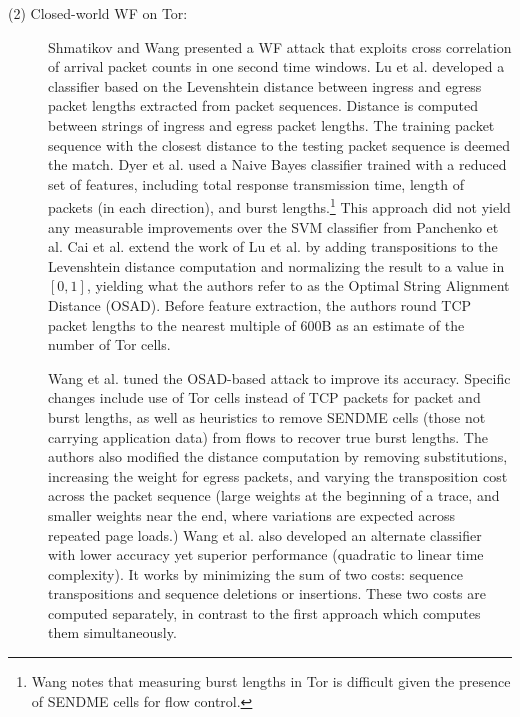 \documentclass[runningheads]{llncs}
\begin{document}
\begin{description}
\item [(2) Closed-world WF on Tor:] Shmatikov and Wang \cite{shmatikov2006timing}
presented a WF attack that exploits cross correlation of arrival packet counts in
one second time windows.
Lu et al. \cite{lu2010website} developed a classifier based on the Levenshtein distance between
ingress and egress packet lengths extracted from packet sequences. Distance is computed between
strings of ingress and egress packet lengths. The training packet sequence with the closest
distance to the testing packet sequence is deemed the match. Dyer et al. \cite{dyer2012peek}
used a Naive Bayes classifier trained with a reduced set of features, including total
response transmission time, length of packets (in each direction), and burst lengths.\footnote{Wang
\cite{wang2016website} notes that measuring burst lengths in Tor is difficult given the presence of
SENDME cells for flow control.} This approach did not yield any measurable improvements over
the SVM classifier from Panchenko et al. Cai et al. \cite{cai2012touching} extend the work of Lu et al.
by adding transpositions to the Levenshtein distance computation and normalizing the result to
a value in $[0,1]$, yielding what the authors refer to as the Optimal String Alignment Distance
(OSAD). Before feature extraction, the authors round TCP packet lengths to the nearest multiple of
$600$B as an estimate of the number of Tor cells.

Wang et al. \cite{wang2013improved} tuned the OSAD-based attack to improve its accuracy. Specific changes
include use of Tor cells instead of TCP packets for packet and burst lengths, as well as heuristics
to remove SENDME cells (those not carrying application data) from flows to recover true
burst lengths. The authors also modified the distance computation by removing substitutions,
increasing the weight for egress packets, and varying the transposition cost across the packet
sequence (large weights at the beginning of a trace, and smaller weights near the end, where
variations are expected across repeated page loads.) Wang et al. also developed an alternate classifier
with lower accuracy yet superior performance (quadratic to linear time complexity). It works by
minimizing the sum of two costs: sequence transpositions and sequence deletions or insertions. These
two costs are computed separately, in contrast to the first approach which computes them simultaneously.


\end{description}
\end{document}
